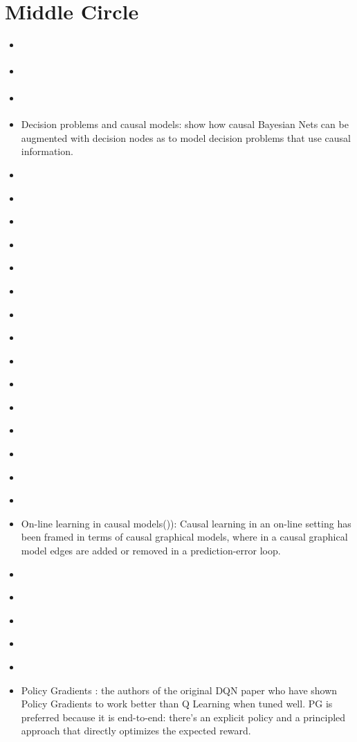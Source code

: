 \documentclass[11pt]{article}
\theoremstyle{plain}
\begin{document}
\section{Middle Circle}
\begin{itemize}
\item \cite{watkins1992q}
\item \cite{baxter2001infinite}
\item \cite{boyan2002technical}
\item Decision problems and causal models: \cite{dawid2002influence} show how causal Bayesian Nets can be augmented with decision nodes as to model decision problems that use causal information.
\item \cite{konda2003onactor}
\item \cite{sanjana2003bayesian}
\item \cite{panait2005cooperative}
\item \cite{de2006learning}
\item \cite{shoham2007if}
\item \cite{richter2007natural}
\item \cite{krynski2007role}
\item \cite{gopnik2007bayesian}
\item \cite{busoniu2008comprehensive}
\item \cite{hagmayer2009decision}
\item \cite{meder2009role}
\item \cite{meder2010observing}
\item \cite{bucsoniu2010multi}
\item \cite{kemp2010learning}
\item \cite{hasselt2010double}
\item On-line learning in causal models(\cite{wellen2012learning})):  Causal learning in an on-line setting has been framed in terms of causal graphical models, where in a causal graphical model edges are added or removed in a prediction-error loop.
\item \cite{grondman2012survey}
\item \cite{nowe2012game}
\item \cite{mnih2013playing}
\item \cite{guo2014deep}
\item \cite{silver2014deterministic}
\item Policy Gradients  \cite{DBLP:journals/corr/MnihBMGLHSK16}: the authors of the original DQN paper who have shown Policy Gradients to work better than Q Learning when tuned well. PG is preferred because it is end-to-end: there’s an explicit policy and a principled approach that directly optimizes the expected reward.

\end{itemize}
\end{document}
